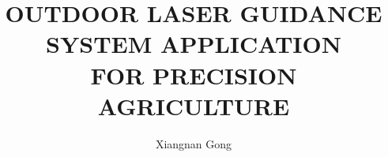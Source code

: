 \documentclass[ece,dissertation]{puthesis}
\title{OUTDOOR LASER GUIDANCE SYSTEM APPLICATION\\
  FOR PRECISION AGRICULTURE}
\author{Xiangnan Gong}{}
\begin{document}
\volume




















%




%
%
%
%
%
%


%
\end{document}
